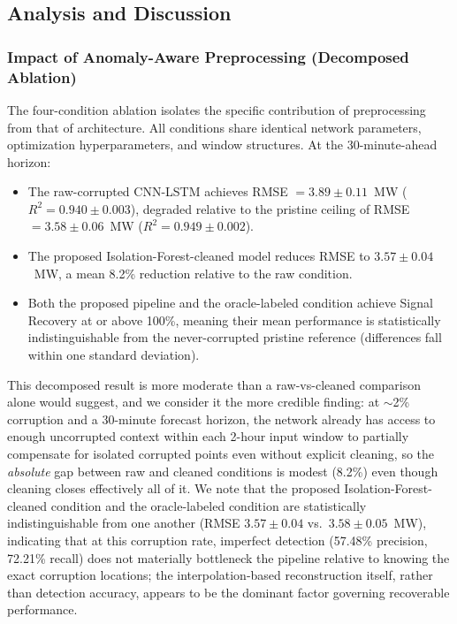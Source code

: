 \documentclass[conference]{IEEEtran}
\begin{document}
\subsection{Analysis and Discussion}

\subsubsection{Impact of Anomaly-Aware Preprocessing (Decomposed Ablation)}
The four-condition ablation isolates the specific contribution of preprocessing from that of architecture. All conditions share identical network parameters, optimization hyperparameters, and window structures. At the 30-minute-ahead horizon:
\begin{itemize}
    \item The raw-corrupted CNN-LSTM achieves RMSE $=3.89 \pm 0.11$~MW ($R^2 = 0.940 \pm 0.003$), degraded relative to the pristine ceiling of RMSE $=3.58 \pm 0.06$~MW ($R^2 = 0.949 \pm 0.002$).
    \item The proposed Isolation-Forest-cleaned model reduces RMSE to $3.57 \pm 0.04$~MW, a mean 8.2\% reduction relative to the raw condition.
    \item Both the proposed pipeline and the oracle-labeled condition achieve Signal Recovery at or above 100\%, meaning their mean performance is statistically indistinguishable from the never-corrupted pristine reference (differences fall within one standard deviation).
\end{itemize}
This decomposed result is more moderate than a raw-vs-cleaned comparison alone would suggest, and we consider it the more credible finding: at $\sim$2\% corruption and a 30-minute forecast horizon, the network already has access to enough uncorrupted context within each 2-hour input window to partially compensate for isolated corrupted points even without explicit cleaning, so the \emph{absolute} gap between raw and cleaned conditions is modest (8.2\%) even though cleaning closes effectively all of it. We note that the proposed Isolation-Forest-cleaned condition and the oracle-labeled condition are statistically indistinguishable from one another (RMSE $3.57 \pm 0.04$ vs.\ $3.58 \pm 0.05$~MW), indicating that at this corruption rate, imperfect detection (57.48\% precision, 72.21\% recall) does not materially bottleneck the pipeline relative to knowing the exact corruption locations; the interpolation-based reconstruction itself, rather than detection accuracy, appears to be the dominant factor governing recoverable performance.
\end{document}
